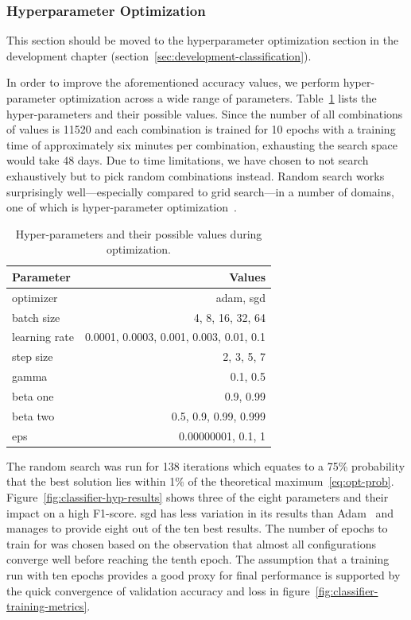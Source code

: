 \documentclass[draft,final]{vutinfth} %
\begin{document}
\subsubsection{Hyperparameter Optimization}
\label{sssec:classifier-hyp-opt}

This section should be moved to the hyperparameter optimization
section in the development chapter
(section~\ref{sec:development-classification}).

In order to improve the aforementioned accuracy values, we perform
hyper-parameter optimization across a wide range of
parameters. Table~\ref{tab:classifier-hyps} lists the hyper-parameters
and their possible values. Since the number of all combinations of
values is 11520 and each combination is trained for 10 epochs with a
training time of approximately six minutes per combination, exhausting
the search space would take 48 days. Due to time limitations, we have
chosen to not search exhaustively but to pick random combinations
instead. Random search works surprisingly well---especially compared to
grid search---in a number of domains, one of which is hyper-parameter
optimization~\cite{bergstra2012}.

\begin{table}[h]
  \centering
  \begin{tabular}{lr}
    \toprule
    Parameter &  Values \\
    \midrule
    optimizer &	adam, sgd \\
    batch size & 4, 8, 16, 32, 64 \\
    learning rate & 0.0001, 0.0003, 0.001, 0.003, 0.01, 0.1 \\
    step size & 2, 3, 5, 7 \\
    gamma & 0.1, 0.5 \\
    beta one & 0.9, 0.99 \\
    beta two & 0.5, 0.9, 0.99, 0.999 \\
    eps & 0.00000001, 0.1, 1 \\
    \bottomrule
  \end{tabular}
  \caption{Hyper-parameters and their possible values during
    optimization.}
  \label{tab:classifier-hyps}
\end{table}

The random search was run for 138 iterations which equates to a 75\%
probability that the best solution lies within 1\% of the theoretical
maximum~\eqref{eq:opt-prob}. Figure~\ref{fig:classifier-hyp-results}
shows three of the eight parameters and their impact on a high
F1-score. \gls{sgd} has less variation in its results than
Adam~\cite{kingma2017} and manages to provide eight out of the ten
best results. The number of epochs to train for was chosen based on
the observation that almost all configurations converge well before
reaching the tenth epoch. The assumption that a training run with ten
epochs provides a good proxy for final performance is supported by the
quick convergence of validation accuracy and loss in
figure~\ref{fig:classifier-training-metrics}.
\end{document}

